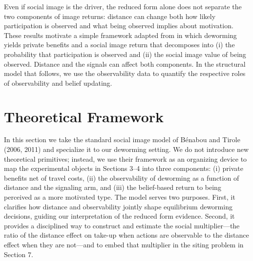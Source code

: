 \documentclass[12pt,a4paper]{article}
\begin{document}
Even if social image is the driver, the reduced form alone does not separate the two components of image returns: distance can change both how likely participation is observed and what being observed implies about motivation. These results motivate a simple framework adapted from \citet{Benabou_laws_2011} in which deworming yields private benefits and a social image return that decomposes into (i) the probability that participation is observed and (ii) the social image value of being observed. Distance and the signals can affect both components. In the structural model that follows, we use the observability data to quantify the respective roles of observability and belief updating.




\section{Theoretical Framework} \label{model}

In this section we take the standard social image model of Bénabou and Tirole (2006, 2011) and specialize it to our deworming setting. We do not introduce new theoretical primitives; instead, we use their framework as an organizing device to map the experimental objects in Sections 3–4 into three components:%
(i) private benefits net of travel costs, (ii) the observability of deworming as a function of distance and the signaling arm, and (iii) the belief-based return to being perceived as a more motivated type. The model serves two purposes. First, it clarifies how distance and observability jointly shape equilibrium deworming decisions, guiding our interpretation of the reduced form evidence. Second, it provides a disciplined way to construct and estimate the social multiplier—the ratio of the distance effect on take-up when actions are observable to the distance effect when they are not—and to embed that multiplier in the siting problem in Section 7. %
\end{document}
